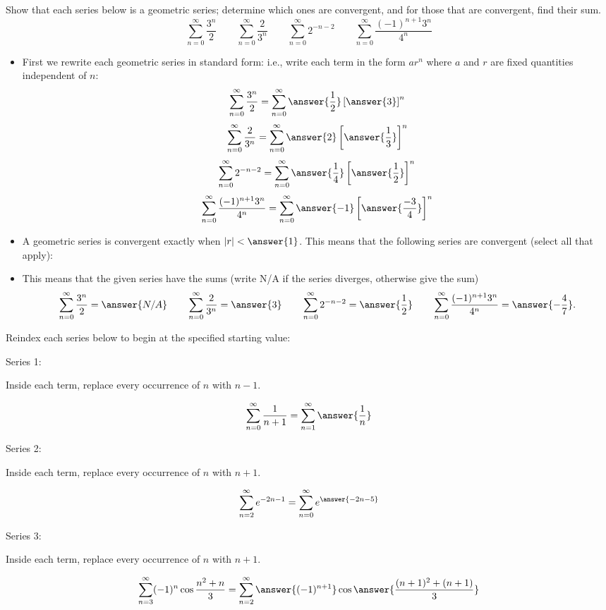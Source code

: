 \documentclass{ximera}
\begin{document}
\begin{example}
Show that each series below is a geometric series; determine which ones are convergent, and for those that are convergent, find their sum.
\[ \sum_{n=0}^\infty \frac{3^n}{2} \qquad \sum_{n=0}^\infty \frac{2}{3^n} \qquad \sum_{n=0}^\infty 2^{-n-2}  \qquad \sum_{n=0}^\infty \frac{(-1)^{n+1} 3^n}{4^n} \]
\begin{itemize}
\item First we rewrite each geometric series in standard form: i.e., write each term in the form $a r^n$ where $a$ and $r$ are fixed quantities independent of $n$:
\[ \sum_{n=0}^\infty \frac{3^n}{2} = \sum_{n=0}^\infty \answer{\frac{1}{2}} \left[ \answer{3} \right]^n \]
\[ \sum_{n=0}^\infty \frac{2}{3^n} = \sum_{n=0}^\infty \answer{2} \left[ \answer{\frac{1}{3}} \right]^n \]
\[ \sum_{n=0}^\infty 2^{-n-2} = \sum_{n=0}^\infty \answer{\frac{1}{4}} \left[ \answer{\frac{1}{2}} \right]^n \]
\[ \sum_{n=0}^\infty \frac{(-1)^{n+1} 3^n}{4^n} = \sum_{n=0}^\infty \answer{-1} \left[ \answer{\frac{-3}{4}} \right]^n \]
\item A geometric series is convergent exactly when $|r| < \answer{1}$. This means that the following series are convergent (select all that apply):
\begin{selectAll}
\end{selectAll}
\item This means that the given series have the sums (write N/A if the series diverges, otherwise give the sum)
\[  \sum_{n=0}^\infty \frac{3^n}{2} = \answer{N/A} \qquad \sum_{n=0}^\infty \frac{2}{3^n} = \answer{3} \qquad \sum_{n=0}^\infty 2^{-n-2}  = \answer{\frac{1}{2}} \qquad \sum_{n=0}^\infty \frac{(-1)^{n+1} 3^n}{4^n} = \answer{-\frac{4}{7}}. \]
\end{itemize}
\end{example}

\begin{example}
Reindex each series below to begin at the specified starting value:

Series 1: \begin{hint} Inside each term, replace every occurrence of $n$ with $n-1$. \end{hint}
\[ \sum_{n=0}^\infty \frac{1}{n+1} = \sum_{n=1}^\infty \answer{\frac{1}{n}} \]

Series 2: \begin{hint} Inside each term, replace every occurrence of $n$ with $n+1$. \end{hint}
\[ \sum_{n=2}^\infty e^{-2n-1} =  \sum_{n=0}^\infty e^{\answer{-2n-5}} \]

Series 3: \begin{hint} Inside each term, replace every occurrence of $n$ with $n+1$. \end{hint}
\[ \sum_{n=3}^\infty (-1)^n \cos \frac{n^2 + n}{3} = \sum_{n=2}^\infty \answer{(-1)^{n+1}} \cos \answer{\frac{(n+1)^2+(n+1)}{3}} \]
\end{example}
\end{document}

